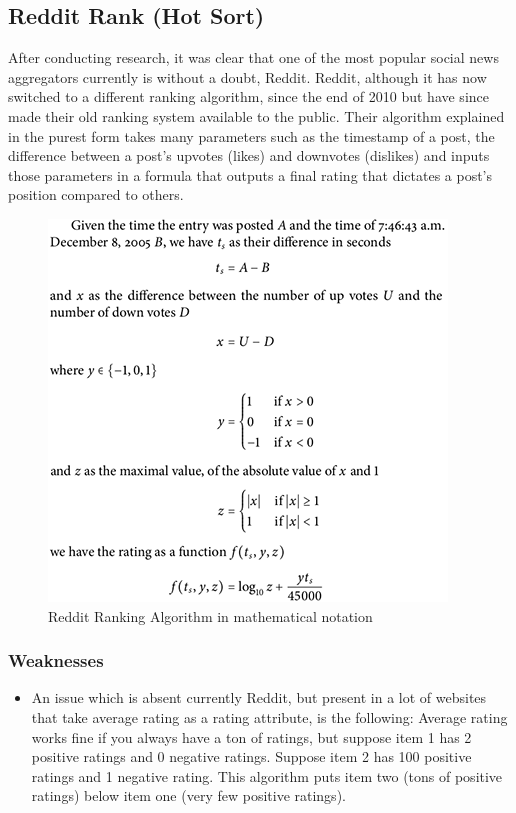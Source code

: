 \subsection {Reddit Rank (Hot Sort)}
After conducting research, it was clear that one of the most popular social news aggregators currently is without a doubt, Reddit. Reddit, although it has now switched to a different ranking algorithm, since the end of 2010 but have since made their old ranking system available to the public. Their algorithm explained in the purest form takes many parameters such as the timestamp of a post, the difference between a post’s upvotes (likes) and downvotes (dislikes) and inputs those parameters in a formula that outputs a final rating that dictates a post’s position compared to others.

\begin{figure}[!htb]
 \begin{center}
	 \includegraphics{Figures/reddit_rank}
 \end{center}
 \caption{Reddit Ranking Algorithm in mathematical notation}
\end{figure}


\subsubsection {Weaknesses}
\begin{itemize}
  \item An issue which is absent currently Reddit, but present in a lot of websites that take average rating as a rating attribute, is the following: Average rating works fine if you always have a ton of ratings, but suppose item 1 has 2 positive ratings and 0 negative ratings. Suppose item 2 has 100 positive ratings and 1 negative rating. This algorithm puts item two (tons of positive ratings) below item one (very few positive ratings).
\end{itemize}

